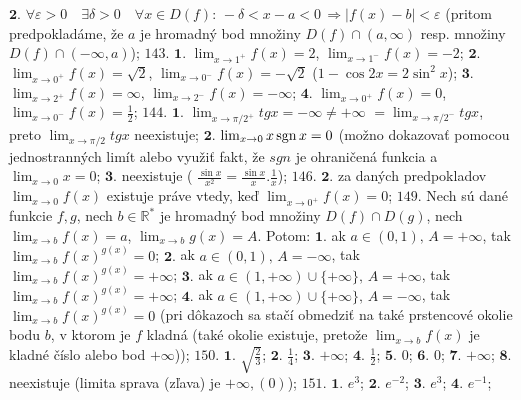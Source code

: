 $\boldsymbol{2.}$
$\forall \varepsilon >0 \quad \exists \delta >0 \quad \forall x \in D(f): \, -\delta< x-a < 0 \, \Rightarrow \vert f(x) - b \vert < \varepsilon$ (pritom predpokladáme, že $a$ je hromadný bod množiny $ D(f) \cap (a, \infty )$ resp. množiny $D(f) \cap (-\infty, a)$);
$\boxed{143.}$
$\boldsymbol{1.}$
$\lim_{x\rightarrow 1^{+}} f(x) =2$, $\lim_{x\rightarrow 1^{-}} f(x) =-2$;
$\boldsymbol{2.}$
$\lim_{x\rightarrow 0^{+}} f(x) =\sqrt{2}$, $\lim_{x\rightarrow 0^{-}} f(x) =-\sqrt{2}$ ($1-\cos 2x = 2\sin ^{2}x $);
$\boldsymbol{3.}$
$\lim_{x\rightarrow 2^{+}} f(x) =\infty$, $\lim_{x\rightarrow 2^{-}} f(x) =-\infty$;
$\boldsymbol{4.}$
$\lim_{x\rightarrow 0^{+}} f(x) =0$, $\lim_{x\rightarrow 0^{-}} f(x) =\frac{1}{2}$;
$\boxed{144.}$
$\boldsymbol{1.}$
$\lim_{x\rightarrow \pi/2^{+}} tg x =-\infty \ne +\infty $ $=\lim_{x\rightarrow \pi/2^{-}} tg x$, preto $\lim_{x\rightarrow \pi/2} tg x$ neexistuje;
$\boldsymbol{2.}$
$\lim_{x\rightarrow 0}x \operatorname{sgn} x = 0$ (možno dokazovať pomocou jednostranných limít alebo využiť fakt, že $sgn$ je ohraničená funkcia a $\lim_{x\rightarrow 0}x  = 0$;
$\boldsymbol{3.}$ neexistuje ( $ \frac{\sin x}{x^{2}} = \frac{\sin x}{x} . \frac{1}{x}$);
$\boxed{146.}$
$\boldsymbol{2.}$
za daných predpokladov $\lim_{x\rightarrow 0} f(x)$ existuje práve vtedy, keď $\lim_{x\rightarrow 0^{+}} f(x)=0$;
$\boxed{149.}$
Nech sú dané funkcie $f,g $, nech $b \in \mathbb{R^{*}} $ je hromadný bod množiny $D(f) \cap D(g) $, nech $\lim_{x\rightarrow b} f(x)=a$, $\lim_{x\rightarrow b} g(x)=A$. Potom: $\boldsymbol{1.}$ ak $a \in (0,1),\, A= +\infty  $, tak 
$\lim_{x\rightarrow b} f(x)^{g(x)}=0$;
$\boldsymbol{2.}$ ak $a \in (0,1),\, A= -\infty  $, tak $\lim_{x\rightarrow b} f(x)^{g(x)}=+\infty$;
$\boldsymbol{3.}$ ak $a \in (1,+\infty)\cup \lbrace +\infty \rbrace,\, A= +\infty  $, tak $\lim_{x\rightarrow b} f(x)^{g(x)}=+\infty$; 
$\boldsymbol{4.}$ ak $a \in (1,+\infty)\cup \lbrace +\infty \rbrace,\, A= -\infty  $, tak $\lim_{x\rightarrow b} f(x)^{g(x)}=0$ (pri dôkazoch sa stačí obmedziť na také prstencové okolie bodu $b$, v ktorom je $f$ kladná (také okolie existuje, pretože $\lim_{x\rightarrow b} f(x)$ je kladné číslo alebo bod $+ \infty$)); 
$\boxed{150.}$
$\boldsymbol{1.}$  $\sqrt{\frac{2}{3}} $;
$\boldsymbol{2.}$  $\frac{1}{4} $;
$\boldsymbol{3.}$  $+\infty $;
$\boldsymbol{4.}$  $\frac{1}{2} $;
$\boldsymbol{5.}$  $0 $;
$\boldsymbol{6.}$  $0 $;
$\boldsymbol{7.}$  $+ \infty $;
$\boldsymbol{8.}$ neexistuje (limita sprava (zľava) je $+\infty, (0) $);
$\boxed{151.}$
$\boldsymbol{1.}$  $e^{3} $;
$\boldsymbol{2.}$  $e^{-2} $;
$\boldsymbol{3.}$  $e^{3} $;
$\boldsymbol{4.}$  $e^{-1} $;
